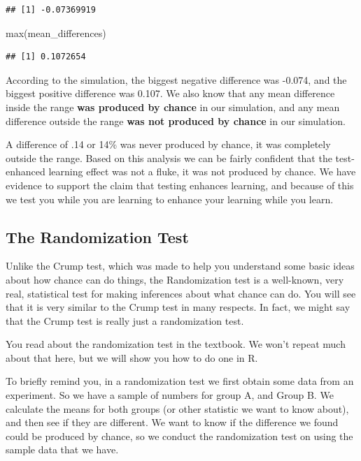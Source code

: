 \documentclass[
]{book}
\newenvironment{Shaded}{\begin{snugshade}}{\end{snugshade}}
\newcommand{\FunctionTok}[1]{\textcolor[rgb]{0.00,0.00,0.00}{#1}}
\newcommand{\NormalTok}[1]{#1}
\begin{document}
\begin{verbatim}
## [1] -0.07369919
\end{verbatim}

\begin{Shaded}
\begin{Highlighting}[]
\FunctionTok{max}\NormalTok{(mean\_differences)}
\end{Highlighting}
\end{Shaded}

\begin{verbatim}
## [1] 0.1072654
\end{verbatim}

According to the simulation, the biggest negative difference was -0.074, and the biggest positive difference was 0.107. We also know that any mean difference inside the range \textbf{was produced by chance} in our simulation, and any mean difference outside the range \textbf{was not produced by chance} in our simulation.

A difference of .14 or 14\% was never produced by chance, it was completely outside the range. Based on this analysis we can be fairly confident that the test-enhanced learning effect was not a fluke, it was not produced by chance. We have evidence to support the claim that testing enhances learning, and because of this we test you while you are learning to enhance your learning while you learn.

\hypertarget{the-randomization-test}{%
\subsection{The Randomization Test}\label{the-randomization-test}}

Unlike the Crump test, which was made to help you understand some basic ideas about how chance can do things, the Randomization test is a well-known, very real, statistical test for making inferences about what chance can do. You will see that it is very similar to the Crump test in many respects. In fact, we might say that the Crump test is really just a randomization test.

You read about the randomization test in the textbook. We won't repeat much about that here, but we will show you how to do one in R.

To briefly remind you, in a randomization test we first obtain some data from an experiment. So we have a sample of numbers for group A, and Group B. We calculate the means for both groups (or other statistic we want to know about), and then see if they are different. We want to know if the difference we found could be produced by chance, so we conduct the randomization test on using the sample data that we have.
\end{document}
